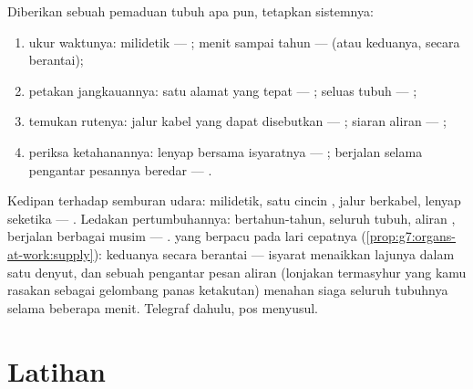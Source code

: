 \begin{method}\label{met:g8:nervous-communication:diagnose}
Diberikan sebuah pemaduan tubuh apa pun, tetapkan sistemnya:
\begin{enumerate}
  \item ukur waktunya: milidetik --- ; menit sampai
        tahun ---  (atau keduanya, secara berantai);
  \item petakan jangkauannya: satu alamat yang tepat ---
        ; seluas tubuh --- ;
  \item temukan rutenya: jalur kabel yang dapat disebutkan
        --- ; siaran aliran  --- ;
  \item periksa ketahanannya: lenyap bersama isyaratnya ---
        ; berjalan selama pengantar pesannya beredar
        --- .
\end{enumerate}
\end{method}

\begin{example}\label{ex:g8:nervous-communication:cases}
Kedipan terhadap semburan udara: milidetik, satu cincin
, jalur berkabel, lenyap seketika --- . Ledakan
pertumbuhannya: bertahun-tahun, seluruh tubuh, aliran ,
berjalan berbagai musim --- .  yang berpacu
pada lari cepatnya (\cref{prop:g7:organs-at-work:supply}):
keduanya secara berantai --- isyarat  menaikkan
lajunya dalam satu denyut, dan sebuah pengantar pesan aliran
 (lonjakan termasyhur yang kamu rasakan sebagai
gelombang panas ketakutan) menahan siaga seluruh tubuhnya
selama beberapa menit. Telegraf dahulu, pos menyusul.
\end{example}

\section{Latihan}

